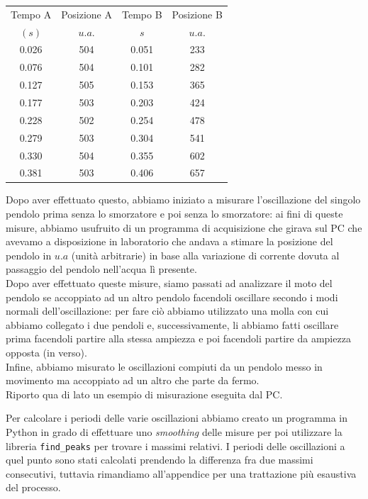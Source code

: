 \documentclass{article}
\begin{document}
\begin{minipage}{0.5\textwidth}
    \centering
    \begin{tabular}{c c c c}
        \toprule
        Tempo A & Posizione A & Tempo B & Posizione B \\
        $(s)$ &  $u.a.$ & $s$ & $u.a.$ \\ \toprule
        0.026 & 504 & 0.051 & 233 \\
        0.076 & 504 & 0.101 & 282 \\
        0.127 & 505 & 0.153 & 365 \\
        0.177 & 503 & 0.203 & 424 \\
        0.228 & 502 & 0.254 & 478 \\
        0.279 & 503 & 0.304 & 541 \\
        0.330 & 504 & 0.355 & 602 \\
        0.381 & 503 & 0.406 & 657 \\ \bottomrule
    \end{tabular}
    \captionsetup{format=plain}
\end{minipage}
\hspace{0.01\textwidth}
\begin{minipage}{0.49\textwidth}
Dopo aver effettuato questo, abbiamo iniziato a misurare l'oscillazione del singolo pendolo prima senza lo smorzatore e poi senza lo smorzatore: ai fini di queste misure, abbiamo usufruito di un programma di acquisizione che girava sul PC che avevamo a disposizione in laboratorio che andava a stimare la posizione del pendolo in $u.a$ (unità arbitrarie) in base alla variazione di corrente dovuta al passaggio del pendolo nell'acqua lì presente. \\
Dopo aver effettuato queste misure, siamo passati ad analizzare il moto del pendolo se accoppiato ad un altro pendolo facendoli oscillare secondo i modi normali dell'oscillazione: per fare ciò abbiamo utilizzato una molla con cui abbiamo collegato i due pendoli e, successivamente, li abbiamo fatti oscillare prima facendoli partire alla stessa ampiezza e poi facendoli partire da ampiezza opposta (in verso). \\
Infine, abbiamo misurato le oscillazioni compiuti da un pendolo messo in movimento ma accoppiato ad un altro che parte da fermo. \\
Riporto qua di lato un esempio di misurazione eseguita dal PC.
\end{minipage}
Per calcolare i periodi delle varie oscillazioni abbiamo creato un programma in Python in grado di effettuare uno \emph{smoothing} delle misure per poi utilizzare la libreria \texttt{find\_peaks} per trovare i massimi relativi. I periodi delle oscillazioni a quel punto sono stati calcolati prendendo la differenza fra due massimi consecutivi, tuttavia rimandiamo all'appendice per una trattazione più esaustiva del processo.
\end{document}

